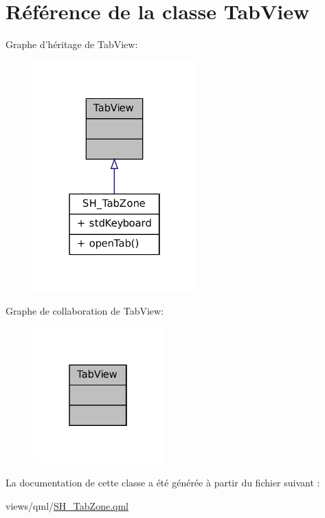 \hypertarget{classTabView}{\section{Référence de la classe Tab\-View}
\label{classTabView}
}


Graphe d'héritage de Tab\-View\-:
\nopagebreak
\begin{figure}[H]
\begin{center}
\leavevmode
\includegraphics[width=178pt]{classTabView__inherit__graph}
\end{center}
\end{figure}


Graphe de collaboration de Tab\-View\-:
\nopagebreak
\begin{figure}[H]
\begin{center}
\leavevmode
\includegraphics[width=142pt]{classTabView__coll__graph}
\end{center}
\end{figure}


La documentation de cette classe a été générée à partir du fichier suivant \-:\begin{DoxyCompactItemize}
\item 
views/qml/\hyperlink{SH__TabZone_8qml}{S\-H\-\_\-\-Tab\-Zone.\-qml}\end{DoxyCompactItemize}
